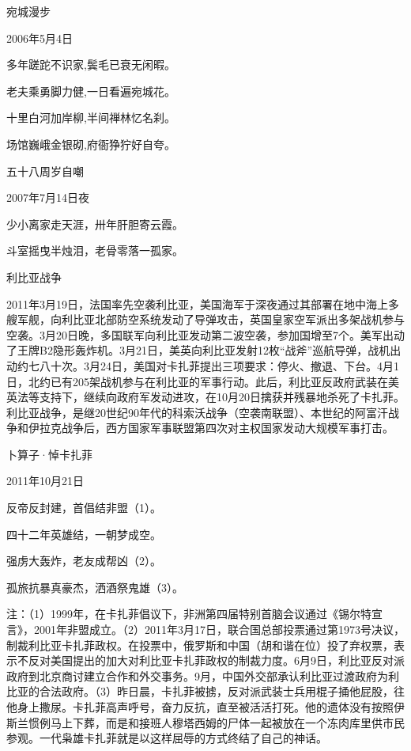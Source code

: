 \documentclass[../../dazhuan.tex]{subfiles}
\begin{document}
宛城漫步

2006年5月4日

多年蹉跎不识家,鬓毛已衰无闲暇。

老夫乘勇脚力健,一日看遍宛城花。

十里白河加岸柳,半间禅林忆名刹。

场馆巍峨金银砌,府衙狰狞好自夸。



五十八周岁自嘲

2007年7月14日夜

少小离家走天涯，卅年肝胆寄云霞。

斗室摇曳半烛泪，老骨零落一孤家。



利比亚战争

2011年3月19日，法国率先空袭利比亚，美国海军于深夜通过其部署在地中海上多艘军舰，向利比亚北部防空系统发动了导弹攻击，英国皇家空军派出多架战机参与空袭。3月20日晚，多国联军向利比亚发动第二波空袭，参加国增至7个。美军出动了王牌B2隐形轰炸机。3月21日，美英向利比亚发射12枚“战斧”巡航导弹，战机出动约七八十次。3月24日，美国对卡扎菲提出三项要求：停火、撤退、下台。4月1日，北约已有205架战机参与在利比亚的军事行动。此后，利比亚反政府武装在美英法等支持下，继续向政府军发动进攻，在10月20日擒获并残暴地杀死了卡扎菲。利比亚战争，是继20世纪90年代的科索沃战争（空袭南联盟）、本世纪的阿富汗战争和伊拉克战争后，西方国家军事联盟第四次对主权国家发动大规模军事打击。

卜算子·悼卡扎菲

2011年10月21日

反帝反封建，首倡结非盟（1）。

四十二年英雄结，一朝梦成空。



强虏大轰炸，老友成帮凶（2）。

孤旅抗暴真豪杰，洒酒祭鬼雄（3）。

注：（1）1999年，在卡扎菲倡议下，非洲第四届特别首脑会议通过《锡尔特宣言》，2001年非盟成立。（2）2011年3月17日，联合国总部投票通过第1973号决议，制裁利比亚卡扎菲政权。在投票中，俄罗斯和中国（胡和谐在位）投了弃权票，表示不反对美国提出的加大对利比亚卡扎菲政权的制裁力度。6月9日，利比亚反对派政府到北京商讨建立合作和外交事务。9月，中国外交部承认利比亚过渡政府为利比亚的合法政府。（3）昨日晨，卡扎菲被掳，反对派武装士兵用棍子捅他屁股，往他身上撒尿。卡扎菲高声呼号，奋力反抗，直至被活活打死。他的遗体没有按照伊斯兰惯例马上下葬，而是和接班人穆塔西姆的尸体一起被放在一个冻肉库里供市民参观。一代枭雄卡扎菲就是以这样屈辱的方式终结了自己的神话。
\end{document}
